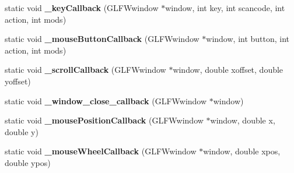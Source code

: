 \begin{DoxyCompactItemize}
\item 
\hypertarget{classs9_1_1gl_1_1GLFWApp_ab1a639c24d823ce4b429081cd8735acd}{static void {\bfseries \-\_\-key\-Callback} (G\-L\-F\-Wwindow $\ast$window, int key, int scancode, int action, int mods)}\label{classs9_1_1gl_1_1GLFWApp_ab1a639c24d823ce4b429081cd8735acd}

\item 
\hypertarget{classs9_1_1gl_1_1GLFWApp_a81f28369aa7f3eb53d4c457e507cadb9}{static void {\bfseries \-\_\-mouse\-Button\-Callback} (G\-L\-F\-Wwindow $\ast$window, int button, int action, int mods)}\label{classs9_1_1gl_1_1GLFWApp_a81f28369aa7f3eb53d4c457e507cadb9}

\item 
\hypertarget{classs9_1_1gl_1_1GLFWApp_acd21fd6f732e56001c1a8a8241f0efdf}{static void {\bfseries \-\_\-scroll\-Callback} (G\-L\-F\-Wwindow $\ast$window, double xoffset, double yoffset)}\label{classs9_1_1gl_1_1GLFWApp_acd21fd6f732e56001c1a8a8241f0efdf}

\item 
\hypertarget{classs9_1_1gl_1_1GLFWApp_a88be880204b5ac067636e99e9a928cf8}{static void {\bfseries \-\_\-window\-\_\-close\-\_\-callback} (G\-L\-F\-Wwindow $\ast$window)}\label{classs9_1_1gl_1_1GLFWApp_a88be880204b5ac067636e99e9a928cf8}

\item 
\hypertarget{classs9_1_1gl_1_1GLFWApp_a82338f06db610bfee909c1b5709c1f73}{static void {\bfseries \-\_\-mouse\-Position\-Callback} (G\-L\-F\-Wwindow $\ast$window, double x, double y)}\label{classs9_1_1gl_1_1GLFWApp_a82338f06db610bfee909c1b5709c1f73}

\item 
\hypertarget{classs9_1_1gl_1_1GLFWApp_a4b62f8fb529ab17da6fd549e18e7113c}{static void {\bfseries \-\_\-mouse\-Wheel\-Callback} (G\-L\-F\-Wwindow $\ast$window, double xpos, double ypos)}\label{classs9_1_1gl_1_1GLFWApp_a4b62f8fb529ab17da6fd549e18e7113c}

\end{DoxyCompactItemize}

